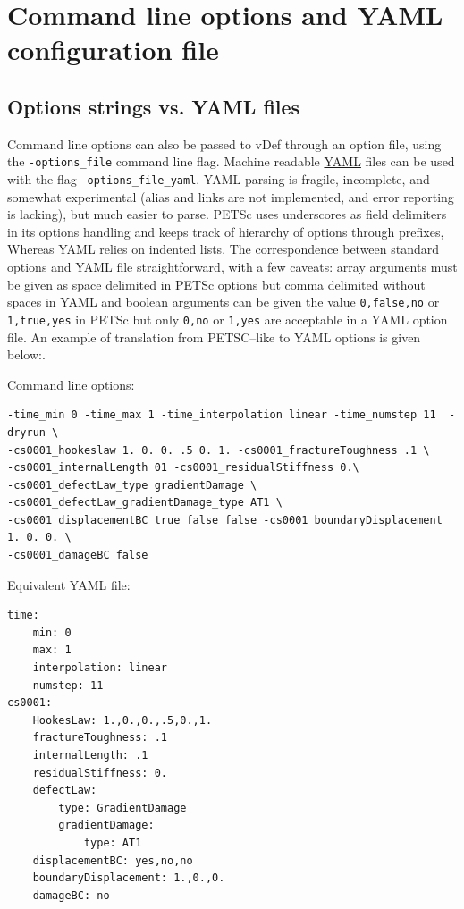 \documentclass[10pt,oneside]{report}
\begin{document}
\chapter{Command line options and YAML configuration file}


\section{Options strings vs. YAML files}
Command line options can also be passed to vDef through an option file, using the \verb+-options_file+ command line flag. Machine readable \href{http://www.yaml.org}{YAML} files can be used with the flag \verb+-options_file_yaml+. YAML parsing is fragile, incomplete, and somewhat experimental (alias and links are not implemented, and error reporting is lacking), but much easier to parse. PETSc  uses  underscores as field delimiters in its options handling and keeps track of hierarchy of options through prefixes, Whereas YAML relies on indented lists. The correspondence between standard options and YAML file straightforward, with a few caveats: array arguments must be given as space delimited in PETSc options but comma delimited without spaces in YAML and boolean arguments can be given the value \verb+0,false,no+ or \verb+1,true,yes+ in PETSc but only \verb+0,no+ or \verb+1,yes+ are acceptable in a YAML option file. An example of translation from PETSC--like to YAML options is given below:.

Command line options:
\begin{verbatim}
-time_min 0 -time_max 1 -time_interpolation linear -time_numstep 11  -dryrun \
-cs0001_hookeslaw 1. 0. 0. .5 0. 1. -cs0001_fractureToughness .1 \
-cs0001_internalLength 01 -cs0001_residualStiffness 0.\
-cs0001_defectLaw_type gradientDamage \
-cs0001_defectLaw_gradientDamage_type AT1 \
-cs0001_displacementBC true false false -cs0001_boundaryDisplacement 1. 0. 0. \
-cs0001_damageBC false
\end{verbatim}
Equivalent YAML file:
\begin{verbatim}
time:
    min: 0
    max: 1
    interpolation: linear
    numstep: 11
cs0001:
    HookesLaw: 1.,0.,0.,.5,0.,1.
    fractureToughness: .1
    internalLength: .1
    residualStiffness: 0.
    defectLaw:
        type: GradientDamage
        gradientDamage:
            type: AT1
    displacementBC: yes,no,no
    boundaryDisplacement: 1.,0.,0.
    damageBC: no
\end{verbatim}
\end{document}
